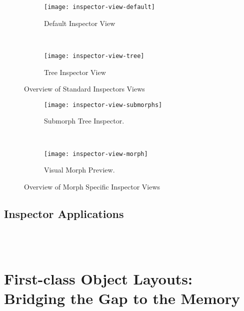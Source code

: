 \begin{figure}[h]
	\centering
	\begin{subfigure}[t]{\textwidth}
		\centering
		\texttt{[image: inspector-view-default]}
		\caption{Default Inspector View}
	\end{subfigure} \\
	\vspace{\baselineskip}
	\begin{subfigure}[t]{\textwidth}
		\centering
		\texttt{[image: inspector-view-tree]}
		\caption{Tree Inspector View}
	\end{subfigure} 

	\caption{Overview of Standard Inspectors Views}
\end{figure}

\begin{figure}[h]
	\centering
	\begin{subfigure}[b]{\textwidth}
		\centering
		\texttt{[image: inspector-view-submorphs]}
		\caption{Submorph Tree Inspector.}
	\end{subfigure}\\
	\vspace{\baselineskip}
	\begin{subfigure}[b]{\textwidth}
		\centering
		\texttt{[image: inspector-view-morph]}
		\caption{Visual Morph Preview.}
	\end{subfigure}
	
	\caption{Overview of Morph Specific Inspector Views}
\end{figure}

\subsection{Inspector Applications}
 \\
 \\

\section{First-class Object Layouts: Bridging the Gap to the Memory}

